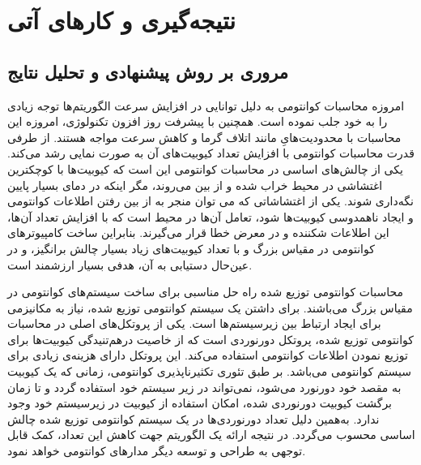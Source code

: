 \chapter{نتیجه‌گیری و کارهای آتی}
\newpage
\section{مروری بر روش پیشنهادی و تحلیل نتایج}



امروزه محاسبات کوانتومی به دلیل توانایی در افزایش سرعت الگوریتم‌ها توجه زیادی را به خود جلب نموده است. همچنین با پیشرفت روز افزون تکنولوژی، امروزه این محاسبات با محدودیت‌هایِ مانند اتلاف گرما و کاهش سرعت مواجه هستند. از طرفی قدرت محاسبات کوانتومی با افزایش تعداد کیوبیت‌های آن به صورت نمایی رشد می‌کند. یکی از چالش‌های اساسی در محاسبات کوانتومی این است که کیوبیت‌ها با کوچکترین اغتشاشی در محیط خراب شده و از بین می‌روند، مگر اینکه در دمای بسیار پایین نگه‌داری شوند. یکی از اغتشاشاتی که می توان منجر به از بین رفتن اطلاعات کوانتومی و ایجاد ناهمدوسی کیوبیت‌ها شود، تعامل آن‌ها در محیط است که با افزایش تعداد آن‌ها، این اطلاعات شکننده و در معرض خطا قرار می‌گیرند. بنابراین ساخت کامپیوترهای کوانتومی در مقیاس بزرگ و با تعداد کیوبیت‌های زیاد بسیار چالش برانگیز، و در عین‌حال دستیابی به آن، هدفی بسیار ارزشمند است.

محاسبات کوانتومی توزیع شده راه حل مناسبی برای ساخت سیستم‌های کوانتومی در مقیاس بزرگ می‌باشند. برای داشتن یک سیستم کوانتومی توزیع شده، نیاز به مکانیزمی برای ایجاد ارتباط بین زیر‌سیستم‌ها است. یکی از پروتکل‌های اصلی در محاسبات کوانتومی توزیع شده، پروتکل دورنوردی است که از خاصیت در‌هم‌تنیدگی کیوبیت‌ها برای توزیع نمودن اطلاعات کوانتومی استفاده می‌کند. این پروتکل دارای هزینه‌ی زیادی برای سیستم کوانتومی می‌باشد. بر طبق تئوری تکثیرناپذیری کوانتومی، زمانی که یک کیوبیت به مقصد خود دورنورد می‌شود،  نمی‌تواند در زیر سیستم خود استفاده گردد و تا زمان برگشت کیوبیت دورنوردی شده، امکان استفاده از کیوبیت در زیرسیستم خود وجود ندارد. به‌همین دلیل تعداد دورنوردی‌ها در یک سیستم کوانتومی توزیع شده چالش اساسی محسوب می‌گردد. در نتیجه ارائه یک الگوریتم جهت کاهش این تعداد، کمک قابل توجهی به طراحی و توسعه دیگر مدارهای کوانتومی خواهد نمود.

